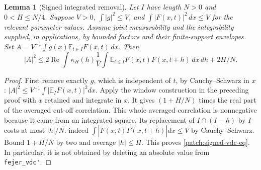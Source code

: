 \documentclass[11pt]{article}
\newtheorem{lemma}[lemma]{Lemma}
\theoremstyle{definition}
\newcommand{\pid}[1]{\nolinkurl{#1}}
\begin{document}
\begin{lemma}[Signed integrated removal]\label{patch:signed-vdc}
Let $I$ have length $N>0$ and $0<H\leq N/4$.  Suppose $V>0$, $\int|g|^2\leq V$, and $\int|F(x,t)|^2\,dx\leq V$ for the relevant
parameter values.  Assume joint measurability and the integrability supplied, in applications,
by bounded factors and their finite-support envelopes.  Set
$A=V^{-1}\int g(x)\mathbb E_{t\in I}F(x,t)\,dx$.  Then
\begin{equation}\label{patch:signed-vdc-eq}
 |A|^2\leq2\operatorname{Re}\int\kappa_H(h)
      \frac1V\int\mathbb E_{t\in I}F(x,t)\overline{F(x,t+h)}\,dx\,dh
      +2H/N.
\end{equation}
\end{lemma}
\begin{proof}
First remove exactly $g$, which is independent of $t$, by Cauchy--Schwarz in $x$:
$|A|^2\leq V^{-1}\int|\mathbb E_I F(x,t)|^2dx$.
Apply the window construction in the preceding proof with $x$ retained and integrate in $x$.
It gives $(1+H/N)$ times the real part of the averaged cut-off correlation.  This whole
averaged correlation is nonnegative because it came from an integrated square.
Its replacement of $I\cap(I-h)$ by $I$ costs at most $|h|/N$: indeed
$\int|F(x,t)\overline{F(x,t+h)}|dx\leq V$ by Cauchy--Schwarz.
Bound $1+H/N$ by two and average $|h|\leq H$.
This proves \eqref{patch:signed-vdc-eq}.  In particular, it is not obtained by deleting an
absolute value from \pid{fejer_vdc'}.
\end{proof}
\end{document}
